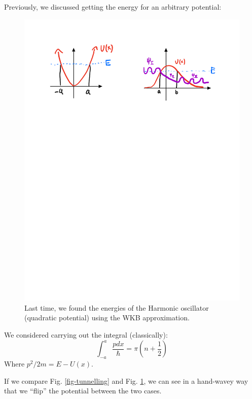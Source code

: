 Previously, we discussed getting the energy for an arbitrary potential:

\begin{figure}[htbp]
    \centering
    \includegraphics[scale=0.8]{Images/fig-WKBenergies.pdf}
    
    \caption{Last time, we found the energies of the Harmonic oscillator (quadratic potential) using the WKB approximation.}
    \label{fig-energyWKB}
\end{figure}


We considered carrying out the integral (classically):
\begin{equation}
    \int_{-a}^a \frac{pdx}{\hbar} = \pi(n + \frac{1}{2})
\end{equation}
Where $p^2/2m = E - U(x)$.

If we compare Fig. \ref{fig-tunnelling} and Fig. \ref{fig-energyWKB}, we can see in a hand-wavey way that we ``flip'' the potential between the two cases.

